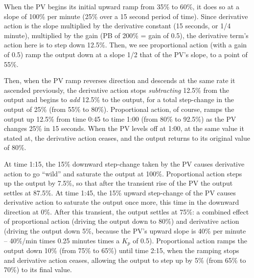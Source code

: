 When the PV begins its initial upward ramp from 35\% to 60\%, it does so at a slope of 100\% per minute (25\% over a 15 second period of time).  Since derivative action is the slope multiplied by the derivative constant (15 seconds, or 1/4 minute), multiplied by the gain (PB of 200\% = gain of 0.5), the derivative term's action here is to step down 12.5\%.  Then, we see proportional action (with a gain of 0.5) ramp the output down at a slope 1/2 that of the PV's slope, to a point of 55\%.  

Then, when the PV ramp reverses direction and descends at the same rate it ascended previously, the derivative action stops {\it subtracting} 12.5\% from the output and begins to {\it add} 12.5\% to the output, for a total step-change in the output of 25\% (from 55\% to 80\%).  Proportional action, of course, ramps the output up 12.5\% from time 0:45 to time 1:00 (from 80\% to 92.5\%) as the PV changes 25\% in 15 seconds.  When the PV levels off at 1:00, at the same value it stated at, the derivative action ceases, and the output returns to its original value of 80\%.

At time 1:15, the 15\% downward step-change taken by the PV causes derivative action to go ``wild'' and saturate the output at 100\%.  Proportional action steps up the output by 7.5\%, so that after the transient rise of the PV the output settles at 87.5\%.  At time 1:45, the 15\% upward step-change of the PV causes derivative action to saturate the output once more, this time in the downward direction at 0\%.  After this transient, the output settles at 75\%: a combined effect of proportional action (driving the output down to 80\%) and derivative action (driving the output down 5\%, because the PV's upward slope is 40\% per minute -- 40\%/min times 0.25 minutes times a $K_p$ of 0.5).  Proportional action ramps the output down 10\% (from 75\% to 65\%) until time 2:15, when the ramping stops and derivative action ceases, allowing the output to step up by 5\% (from 65\% to 70\%) to its final value.











